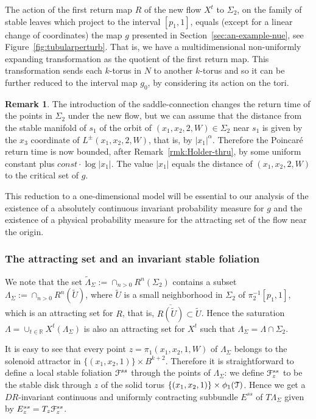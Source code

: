\documentclass[reqno,12pt,a4paper]{amsart}
\theoremstyle{plain}
\theoremstyle{definition}
\newtheorem{remark}[theorem]{Remark}
\begin{document}
The action of the first return map $R$ of the new flow $X^t$
to $\Sigma_2$, on the family of stable leaves which project
to the interval $[p_1,1]$, equals (except for a linear
change of coordinates) the map $g$ presented in
Section~\ref{sec:an-example-nue}, see
Figure~\ref{fig:tubularperturb}. That is, we have a
multidimensional non-uniformly expanding transformation as
the quotient of the first return map.  This transformation
sends each $k$-torus in $N$ to another $k$-torus and so it
can be further reduced to the interval map $g_0$, by
considering its action on the tori.

\begin{remark}
  \label{rmk:poincare-time}
  The introduction of the saddle-connection changes the
  return time of the points in $\Sigma_2$ under the new flow,
  but we can assume that the distance from the stable
  manifold of $s_1$ of the orbit of
  $(x_1,x_2,2,W)\in\Sigma_2$ near $s_1$ is given by the
  $x_3$ coordinate of $L^\pm(x_1,x_2,2,W)$, that is, by
  $|x_1|^\alpha$. Therefore the Poincar\'e return time is
  now bounded, after Remark~\ref{rmk:Holder-thru}, by some
  uniform constant plus $const\cdot\log|x_1|$. The value
  $|x_1|$ equals the distance of $(x_1,x_2,2,W)$ to the
  critical set of $g$.
\end{remark}

This reduction to a one-dimensional model will be essential
to our analysis of the existence of a absolutely continuous
invariant probability measure for $g$ and the existence of
a physical probability measure for the attracting set of the
flow near the origin.

\subsubsection{The attracting set and an invariant stable foliation}
\label{sec:attract-set-its}

We note that the set $\widetilde\Lambda_\Sigma:=\cap_{n>0}
R^n(\Sigma_2)$ contains a subset $\Lambda_\Sigma:=\cap_{n>0}
R^n(\widetilde U)$, where $\widetilde U$ is a small
neighborhood in $\Sigma_2$ of $\pi_2^{-1}[p_1,1]$, which is
an attracting set for $R$, that is, $\overline{R(\widetilde
  U)}\subset\widetilde U$. 
Hence the saturation
$\Lambda=\cup_{t\in{{\mathbb R}}}X^t(\Lambda_\Sigma)$ is
also an attracting set for $X^t$ such that
$\Lambda_\Sigma= \Lambda\cap\Sigma_2$.

It is easy to see that every point $z=\pi_1(x_1,x_2,1,W)$ of
$\Lambda_\Sigma$ belongs to the solenoid attractor in
$\{(x_1,x_2,1)\}\times B^{k+2}$. Therefore it is
straightforward to define a local stable foliation
${\EuScript{F}}^{ss}$ through the points of $\Lambda_\Sigma$: we define
${\EuScript{F}}^{ss}_z$ to be the stable disk through $z$ of the solid
torus $\{(x_1,x_2,1)\}\times \phi_1({\EuScript{T}})$.  Hence we get a
$DR$-invariant continuous and uniformly contracting
subbundle $E^{ss}$ of $T\Lambda_\Sigma$ given by
$E^{ss}_z=T_z{\EuScript{F}}^{ss}_z$.
\end{document}
